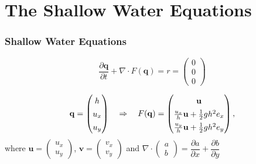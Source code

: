\documentclass{beamer}
\newcommand{\pd}[2]{\dfrac{\partial #1}{\partial #2}}
\begin{document}
\section{The Shallow Water Equations}

\begin{frame}
  \frametitle{Shallow Water Equations}
  \begin{equation}
    \label{eq:shallow-water-basic}
    \pd{\mathbf{q}}{t} + \nabla \cdot F(\mathbf{q}) = r = \begin{pmatrix}
      0 \\ 0\\ 0
    \end{pmatrix}
  \end{equation}

  \begin{eqnarray*}
    \mathbf{q} =
    \begin{pmatrix}
      h \\ u_x \\ u_y
    \end{pmatrix} \quad \Rightarrow \quad F(\mathbf{q}) =
    {
      \renewcommand{\arraystretch}{1.35}
      \begin{pmatrix}
        \mathbf{u} \\ \frac{u_x}{h} \mathbf{u} + \frac{1}{2} g h^2 e_x \\ \frac{u_y}{h} \mathbf{u}+
        \frac{1}{2} g h^2 e_y
      \end{pmatrix},
    }
  \end{eqnarray*}
  where $\mathbf{u}=
  \begin{pmatrix}
    u_x \\ u_y
  \end{pmatrix}$, $\mathbf{v} =
  \begin{pmatrix}
    v_x \\ v_y
  \end{pmatrix}$ and $\nabla \cdot
  \begin{pmatrix}
    a \\ b
  \end{pmatrix} = \pd{a}{x} + \pd{b}{y}$
\end{frame}
\end{document}
